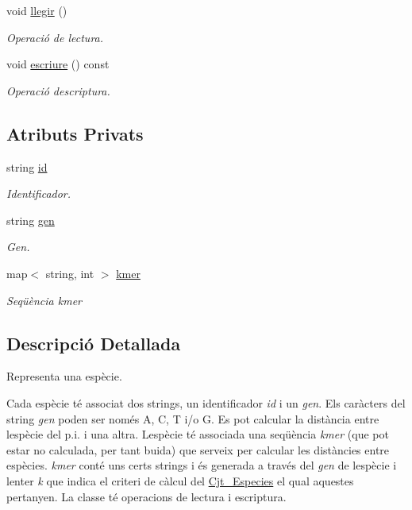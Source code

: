 \begin{DoxyCompactItemize}
void \hyperlink{class_especie_a7384add391d2684c4fb6bdf8a535fba3}{llegir} ()
\begin{DoxyCompactList}\small\item\em Operació de lectura. \end{DoxyCompactList}\item 
void \hyperlink{class_especie_ae24802ae0746b2560a48eea40f64760e}{escriure} () const
\begin{DoxyCompactList}\small\item\em Operació d\textquotesingle{}escriptura. \end{DoxyCompactList}\end{DoxyCompactItemize}
\subsection*{Atributs Privats}
\begin{DoxyCompactItemize}
\item 
string \hyperlink{class_especie_a91b94109fb8a456bba7199cdda36d588}{id}
\begin{DoxyCompactList}\small\item\em Identificador. \end{DoxyCompactList}\item 
string \hyperlink{class_especie_ac35bb565f7346cd6317b3a8c849456d1}{gen}
\begin{DoxyCompactList}\small\item\em Gen. \end{DoxyCompactList}\item 
map$<$ string, int $>$ \hyperlink{class_especie_ab6740db160f2d7335a98fa8d9f745cbe}{kmer}
\begin{DoxyCompactList}\small\item\em Seqüència {\itshape kmer} \end{DoxyCompactList}\end{DoxyCompactItemize}


\subsection{Descripció Detallada}
Representa una espècie. 

Cada espècie té associat dos strings, un identificador {\itshape id} i un {\itshape gen}. Els caràcters del string {\itshape gen} poden ser només \textquotesingle{}A\textquotesingle{}, \textquotesingle{}C\textquotesingle{}, \textquotesingle{}T\textquotesingle{} i/o \textquotesingle{}G\textquotesingle{}. Es pot calcular la distància entre l\textquotesingle{}espècie del p.\+i. i una altra. L\textquotesingle{}espècie té associada una seqüència {\itshape kmer} (que pot estar no calculada, per tant buida) que serveix per calcular les distàncies entre espècies. {\itshape kmer} conté uns certs strings i és generada a través del {\itshape gen} de l\textquotesingle{}espècie i l\textquotesingle{}enter {\itshape k} que indica el criteri de càlcul del \hyperlink{class_cjt___especies}{Cjt\+\_\+\+Especies} el qual aquestes pertanyen. La classe té operacions de lectura i escriptura. 

